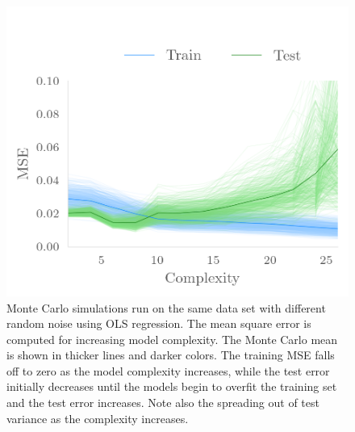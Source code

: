 \begin{figure}[]
  \centering
  \includegraphics[]{figures/testrainmse.png}
  \caption{\label{fig:bias} Monte Carlo simulations run on the same data set
    with different random noise using OLS regression. The mean square error is
    computed for increasing model complexity. The Monte Carlo mean is shown in
    thicker lines and darker colors. The training MSE falls off
  to zero as the model complexity increases, while the test error initially
  decreases until the models begin to overfit the training set and the test
  error increases. Note also the spreading out of test variance as the complexity
  increases.} 
\end{figure}

